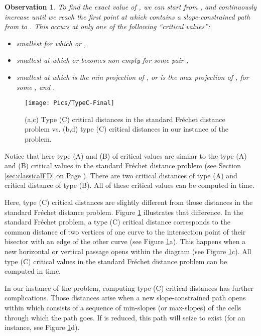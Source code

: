 \documentclass[12pt]{dalthesis}
\newtheorem{obs}{Observation}
\newcommand{\Frechet}{Fr\'echet }
\newcommand{\SC}{slope-constrained }
\begin{document}
\begin{obs}
\label{obs:criticaltypes}
To find the exact value of ,
we can start from , and continuously increase  until
we reach the first point at which  contains a \SC path from  to .
This occurs at only one of the following ``critical values'':
\begin{itemize}
	\item[(A)] smallest  for which  or ,
	\item[(B)] smallest  at which  or   becomes non-empty for some pair ,
	\item[(C)] smallest  at which  is the min projection of , or 
		 is the max projection of , for some , and  .
\end{itemize}

\end{obs}


\begin{figure}[t]
	\centering
	\texttt{[image: Pics/TypeC-Final]}  
	\caption{(a,c) Type (C) critical distances in the standard \Frechet distance problem vs. 
	(b,d) type (C) critical distances in our instance of the problem.}
	\label{fig:typeCCC}
\end{figure}

Notice that here
type (A) and (B) of critical values are similar to 
the type (A) and (B) critical values in the standard \Frechet 
distance problem
(see Section \ref{sec:classicalFD} on Page \pageref{alg:StandardFDec}).
There are two critical distances of type (A) and 
 critical distance of type (B). All of these critical values 
can be computed in    time.

Here, type (C) critical distances are slightly different from 
those distances in the standard 
\Frechet distance problem. 
Figure \ref{fig:typeCCC} illustrates that difference. 
In the standard \Frechet problem, a type (C) critical distance
corresponds to the common distance of two vertices of one curve 
to the intersection point of their bisector 
with an edge of the other curve (see Figure \ref{fig:typeCCC}a). This happens 
when a new horizontal or vertical passage opens within the diagram
(see Figure \ref{fig:typeCCC}c).
All  type (C) critical values in the standard \Frechet distance problem 
can be computed in  time. 

In our instance of the problem, computing type (C) critical distances
has further complications.  
Those distances arise when a new slope-constrained path opens within 
which consists of a sequence of min-slopes (or max-slopes)
of the cells through which the path goes.
If  is reduced, this path will seize to exist 
(for an instance, see Figure \ref{fig:typeCCC}d).
\end{document}
